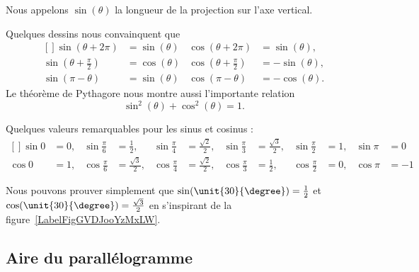 Nous appelons $\sin(\theta)$ la longueur de la projection sur l'axe vertical.

Quelques dessins nous convainquent que
\begin{equation}
	\begin{aligned}[]
		\sin(\theta+2\pi)            & =\sin(\theta) & \cos(\theta+2\pi)            & =\sin(\theta),  \\
		\sin(\theta+\frac{ \pi }{2}) & =\cos(\theta) & \cos(\theta+\frac{ \pi }{2}) & =-\sin(\theta), \\
		\sin(\pi-\theta)             & =\sin(\theta) & \cos(\pi-\theta)             & =-\cos(\theta).
	\end{aligned}
\end{equation}
Le théorème de Pythagore nous montre aussi l'importante relation
\begin{equation}
	\sin^2(\theta)+\cos^2(\theta)=1.
\end{equation}

Quelques valeurs remarquables pour les sinus et cosinus :
\begin{equation}
	\begin{aligned}[]
		\sin 0 & =0, & \sin\frac{ \pi }{ 6 } & =\frac{ 1 }{2},        & \sin\frac{ \pi }{ 4 } & =\frac{ \sqrt{2} }{2}, & \sin\frac{ \pi }{ 3 } & =\frac{ \sqrt{3} }{2}, & \sin\frac{ \pi }{2} & =1, & \sin\pi & =0  \\
		\cos 0 & =1, & \cos\frac{ \pi }{ 6 } & =\frac{ \sqrt{3} }{2}, & \cos\frac{ \pi }{ 4 } & =\frac{ \sqrt{2} }{2}, & \cos\frac{ \pi }{ 3 } & =\frac{ 1 }{2},        & \cos\frac{ \pi }{2} & =0, & \cos\pi & =-1
	\end{aligned}
\end{equation}

Nous pouvons prouver simplement que $\sin(\unit{30}{\degree})=\frac{ 1 }{2}$ et $\cos(\unit{30}{\degree})=\frac{ \sqrt{3} }{2}$ en s'inspirant de la figure~\ref{LabelFigGVDJooYzMxLW}. %
\newcommand{\CaptionFigGVDJooYzMxLW}{Un triangle équilatéral de côté $1$.}


\subsection{Aire du parallélogramme}

